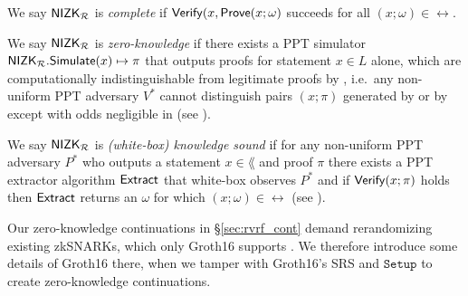 \begin{definition}\label{def:nizk_completeness}
We say ${\mathsf{NIZK}}_\mathcal{R}$ is {\em complete} if ${\mathsf{Verify}}(x, {\mathsf{Prove}}(x; \omega)$ succeeds for all $(x; \omega) \in \rel$.  %
\end{definition}

\def\advV{\ensuremath{V^*}\xspace} %

\begin{definition}\label{def:nizk_zero_knowledge}
We say ${\mathsf{NIZK}}_\mathcal{R}$ is {\em zero-knowledge} if
there exists a PPT simulator ${\mathsf{NIZK}}_\mathcal{R}.{\mathsf{Simulate}}(x) \mapsto \pi$
that outputs proofs for statement $x \in L$ alone, which are
computationally indistinguishable from legitimate proofs by \Prove,
i.e.\ any non-uniform PPT adversary \advV cannot distinguish pairs $(x; \pi)$
generated by \Simulate or by \Prove except with odds negligible in \secparam
(see \cite[Def. 9, \S A, pap. 29]{RandomizationGroth16}). %
\end{definition}

\def\advP{\ensuremath{P^*}\xspace} %

\begin{definition}\label{def:nizk_knowledge_sound}
We say ${\mathsf{NIZK}}_\mathcal{R}$ is {\em (white-box) knowledge sound} if
for any non-uniform PPT adversary \advP who outputs a statement $x \in \lang$ and proof $\pi$
there exists a PPT extractor algorithm ${\mathsf{Extract}}$ that white-box observes $\advP$ and
if ${\mathsf{Verify}}(x; \pi)$ holds then ${\mathsf{Extract}}$ returns an $\omega$ for which $(x; \omega) \in \rel$
(see \cite[Def. 7, \S A, pap. 29]{RandomizationGroth16}).
\end{definition}

Our zero-knowledge continuations in \S\ref{sec:rvrf_cont} demand
rerandomizing existing zkSNARKs, which only Groth16 supports \cite{Groth16}.
We therefore introduce some details of Groth16 \cite{Groth16} there,
when we tamper with Groth16's SRS and $\mathtt{Setup}$ to create zero-knowledge continuations. 

%

